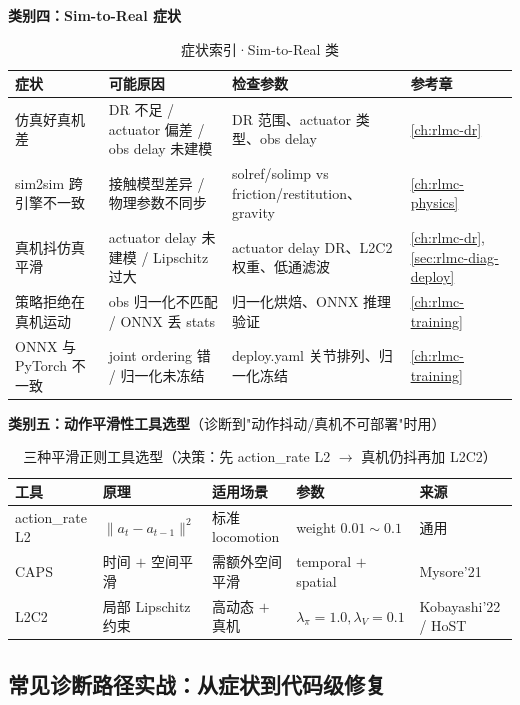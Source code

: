 \textbf{类别四：Sim-to-Real 症状}

\begin{table}[H]
\centering
\caption{症状索引·Sim-to-Real 类}
\label{tab:rlmc-diag-idx-sim2real}
\begin{tabular}{p{3.6cm}p{3.8cm}p{3.4cm}p{1.8cm}}
\hline
症状 & 可能原因 & 检查参数 & 参考章 \\
\hline
仿真好真机差 & DR 不足 / actuator 偏差 / obs delay 未建模 & DR 范围、actuator 类型、obs delay & \cref{ch:rlmc-dr} \\
sim2sim 跨引擎不一致 & 接触模型差异 / 物理参数不同步 & solref/solimp vs friction/restitution、gravity & \cref{ch:rlmc-physics} \\
真机抖仿真平滑 & actuator delay 未建模 / Lipschitz 过大 & actuator delay DR、L2C2 权重、低通滤波 & \cref{ch:rlmc-dr},\cref{sec:rlmc-diag-deploy} \\
策略拒绝在真机运动 & obs 归一化不匹配 / ONNX 丢 stats & 归一化烘焙、ONNX 推理验证 & \cref{ch:rlmc-training} \\
ONNX 与 PyTorch 不一致 & joint ordering 错 / 归一化未冻结 & deploy.yaml 关节排列、归一化冻结 & \cref{ch:rlmc-training} \\
\hline
\end{tabular}
\end{table}

\textbf{类别五：动作平滑性工具选型}（诊断到"动作抖动/真机不可部署"时用）

\begin{table}[H]
\centering
\caption{三种平滑正则工具选型（决策：先 action\_rate L2 $\to$ 真机仍抖再加 L2C2）}
\label{tab:rlmc-diag-smooth-pick}
\begin{tabular}{p{2.2cm}p{3.4cm}p{3.0cm}p{2.8cm}p{2.2cm}}
\hline
工具 & 原理 & 适用场景 & 参数 & 来源 \\
\hline
action\_rate L2 & $\|a_t-a_{t-1}\|^2$ & 标准 locomotion & weight $0.01\sim0.1$ & 通用 \\
CAPS & 时间 $+$ 空间平滑 & 需额外空间平滑 & temporal $+$ spatial & Mysore'21 \\
L2C2 & 局部 Lipschitz 约束 & 高动态 $+$ 真机 & $\lambda_\pi{=}1.0,\lambda_V{=}0.1$ & Kobayashi'22 / HoST \\
\hline
\end{tabular}
\end{table}

\subsection{常见诊断路径实战：从症状到代码级修复}

